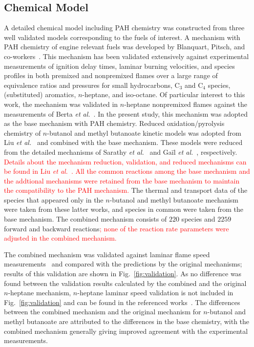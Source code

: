 \documentclass[review,3p,times]{elsarticleUS}
\begin{document}
\subsection{Chemical Model} 

A detailed chemical model including PAH chemistry was constructed from three well validated models corresponding to the fuels of interest. A mechanism with PAH chemistry of engine relevant fuels was developed by Blanquart, Pitsch, and co-workers~\cite{blanquart09b,narayanaswamy10}. This mechanism has been validated extensively against experimental measurements of ignition delay times, laminar burning velocities, and species profiles in both premixed and nonpremixed flames over a large range of equivalence ratios and pressures for small hydrocarbons, C$_3$ and C$_4$ species, (substituted) aromatics, $n$-heptane, and iso-octane. Of particular interest to this work, the mechanism was validated in $n$-heptane nonpremixed flames against the measurements of Berta \emph{et al.}~\cite{berta06}. In the present study, this mechanism was adopted as the base mechanism with PAH chemistry. Reduced oxidation/pyrolysis chemistry of $n$-butanol and methyl butanoate kinetic models was adopted from Liu \emph{et al.}~\cite{liu11} and combined with the base mechanism.  These models were reduced from the detailed mechanisms of Sarathy \emph{et al.}~\cite{sarathy09} and Ga\"il \emph{et al.}~\cite{gail08}, respectively. \textcolor{red}{Details about the mechanism reduction, validation, and reduced mechanisms can be found in Liu \emph{et al.}~\cite{liu11}.  All the common reactions among the base mechanism and the addtional mechanisms were retained from the base mechanism to maintain the compatibility to the PAH mechanism.} The thermal and transport data of the species that appeared only in the $n$-butanol and methyl butanoate mechanism were taken from these latter works, and species in common were taken from the base mechanism. The combined mechanism consists of $220$ species and $2259$ forward and backward reactions\textcolor{red}{; none of the reaction rate parameters were adjusted in the combined mechanism.}

The combined mechanism  was validated against laminar flame speed measurements~\cite{liu11} and compared with the predictions by the original mechanisms; results of this validation are shown in Fig.~\ref{fig:validation}.  As no difference was found between the validation results calculated by the combined and the original $n$-heptane mechanism, $n$-heptane laminar speed validation is not included in Fig.~\ref{fig:validation} and can be found in the referenced works~\cite{blanquart09b,narayanaswamy10}.  The differences between the combined mechanism and the original mechanism for $n$-butanol and methyl butanoate are attributed to the differences in the base chemistry, with the combined mechanism generally giving improved agreement with the experimental measurements.  
\end{document}
